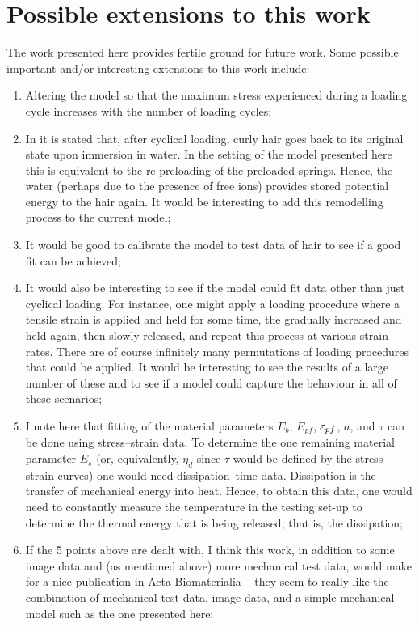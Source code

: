 \documentclass{article}
\begin{document}
\section{Possible extensions to this work}
The work presented here provides fertile ground for future work. Some possible important and/or interesting extensions to this work include:
\begin{enumerate}
	\item Altering the model so that the maximum stress experienced during a loading cycle increases with the number of loading cycles;
	\item In \cite{ngoepe2021evolving} it is stated that, after cyclical loading, curly hair goes back to its original state upon immersion in water. In the setting of the model presented here this is equivalent to the re-preloading of the preloaded springs. Hence, the water (perhaps due to the presence of free ions) provides stored potential energy to the hair again. It would be interesting to add this remodelling process to the current model;
	\item It would be good to calibrate the model to test data of hair to see if a good fit can be achieved; 
	\item It would also be interesting to see if the model could fit data other than just cyclical loading. For instance, one might apply a loading procedure where a tensile strain is applied and held for some time, the gradually increased and held again, then slowly released, and repeat this process at various strain rates. There are of course infinitely many permutations of loading procedures that could be applied. It would be interesting to see the results of a large number of these and to see if a model could capture the behaviour in all of these scenarios;
	\item I note here that fitting of the material parameters $E_b$, $E_{pf}$, $\varepsilon_{pf}$, $a$, and $\tau$ can be done using stress--strain data. To determine the one remaining material parameter $E_s$ (or, equivalently, $\eta_{d}$ since $\tau$ would be defined by the stress strain curves) one would need dissipation--time data. Dissipation is the transfer of mechanical energy into heat. Hence, to obtain this data, one would need to constantly measure the temperature in the testing set-up to determine the thermal energy that is being released; that is, the dissipation;
	\item If the 5 points above are dealt with, I think this work, in addition to some image data and (as mentioned above) more mechanical test data, would make for a nice publication in Acta Biomaterialia -- they seem to really like the combination of mechanical test data, image data, and a simple mechanical model such as the one presented here;

\end{enumerate}
\end{document}
